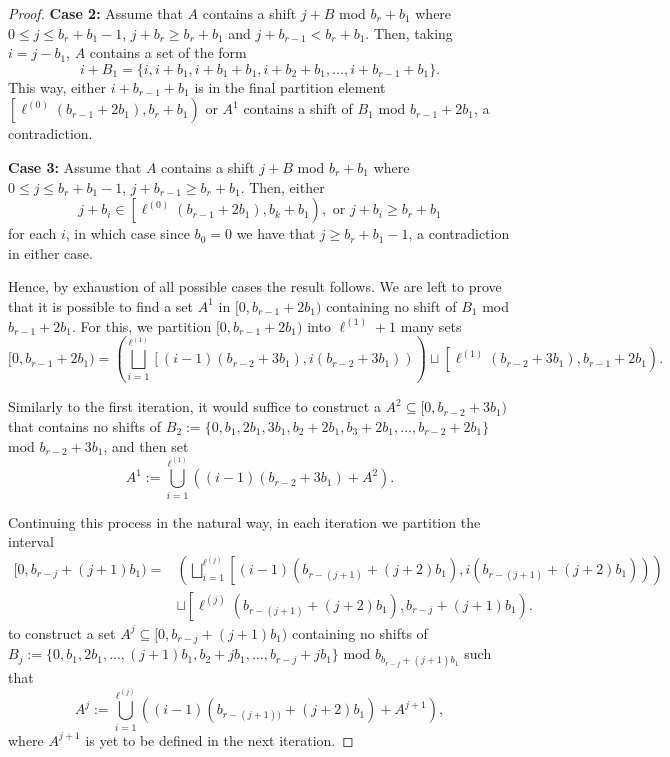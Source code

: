 \documentclass[letter, 11pt]{article}
\theoremstyle{plain} %
\theoremstyle{definition} %
\theoremstyle{plain}
\theoremstyle{plain}
\newcommand{\1}{\mathbbm{1}}
\begin{document}
\begin{proof}
    \textbf{Case 2:} Assume that $A$ contains a shift $j + B $ mod $b_r + b_1$ where $0\leq j \leq b_r+b_1 -1$, $j + b_r \geq b_r + b_1 $ and $j + b_{r-1} < b_r + b_1$. Then, taking $i = j-b_1 $, $A$ contains a set of the form $$i+B_1=\{i, i+b_1, i + b_1 + b_1, i + b_2 + b_1, \ldots, i + b_{r-1} + b_1\}.$$ This way, either $i + b_{r-1} + b_1$ is in the final partition element $\left[\ell^{(0)}(b_{r-1} + 2 b_1), b_r + b_1 \right)$ or $A^1$ contains a shift of $B_1$ mod $b_{r-1}+2b_1$, a contradiction.

    \textbf{Case 3:} Assume that $A$ contains a shift $j + B $ mod $b_r + b_1$ where $0\leq j \leq b_r+b_1 -1$, $j + b_{r-1} \geq b_r + b_1 $. Then, either $$j+ b_i \in \left[\ell^{(0)}(b_{r-1} + 2 b_1), b_k + b_1 \right),\text{ or }j + b_i \geq b_r + b_1$$ for each $i$, in which case since $b_0 = 0$ we have that $j \geq b_r + b_1 -1$, a contradiction in either case.

    Hence, by exhaustion of all possible cases the result follows. We are left to prove that it is possible to find a set $A^1$ in $[0, b_{r-1} + 2b_1 )$ containing no shift of $B_1$ mod $b_{r-1}+2b_1$. For this, we partition $[0, b_{r-1} + 2b_1 )$ into $\ell^{(1)}+1$ many sets
        \[ [0, b_{r-1}+2b_1 )= \left( \bigsqcup_{i=1}^{\ell^{(1)}}\left[(i -1)(b_{r-2} + 3b_1), i(b_{r-2} + 3b_1)\right) \right) \sqcup   \left[\ell^{(1)}(b_{r-2} + 3b_1), b_{r-1}+ 2b_1 \right).\]
    
    Similarly to the first iteration, it would suffice to construct a $A^2 \subseteq [0, b_{r-2} + 3b_1)$ that contains no shifts of $B_2:=\{0, b_1, 2b_1, 3b_1, b_2 + 2b_1, b_3 + 2b_1, \ldots , b_{r-2} + 2b_1\}$ mod $b_{r-2} + 3b_1$, and then set
        $$A^1:=\bigcup_{i=1}^{\ell^{(1)}} \left( (i-1)(b_{r-2} + 3 b_1) + A^2  \right). $$
 
    Continuing this process in the natural way, in each iteration we partition the interval 
\begin{align*}
    [0, b_{r-j}+(j+1)b_1 )= &\left( \bigsqcup_{i=1}^{\ell^{(j)}}\left[(i -1)(b_{r-(j+1)} + (j+2)b_1), i(b_{r-(j+1)} + (j+2)b_1)\right) \right)\\
    &\sqcup   \left[\ell^{(j)}(b_{r-(j+1)} + (j+2)b_1), b_{r-j}+ (j+1)b_1 \right).
\end{align*}
    to construct a set $A^{j}\subseteq [0,b_{r-j} + (j+1)b_1)$ containing no shifts of $B_j:=\{0,b_1,2b_1,\ldots,(j+1)b_1, b_2+jb_1,\ldots, b_{r-j}+jb_1\}$ mod $b_{b_{r-j} + (j+1)b_1}$ such that  
    $$A^{j}:=\bigcup_{i=1}^{\ell^{(j)}} \left( (i-1)(b_{r-(j+1))} + (j+2) b_1) + A^{j+1}  \right), $$
    where $A^{j+1}$ is yet to be defined in the next iteration.
    

\end{proof}
\end{document}
